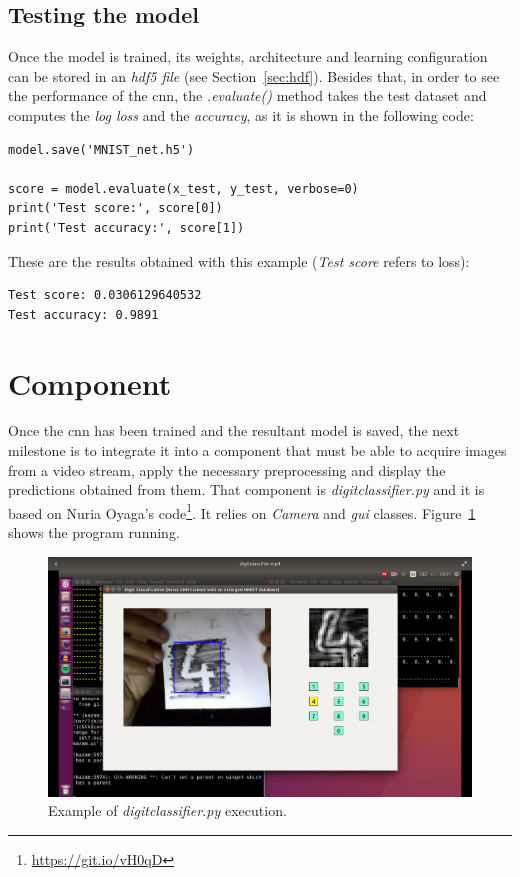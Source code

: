 \subsection{Testing the model}
Once the model is trained, its weights, architecture and learning configuration can be stored in an \emph{\gls{hdf5} file} (see Section~\ref{sec:hdf}). Besides that, in order to see the performance of the \gls{cnn}, the \textit{.evaluate()} method takes the test dataset and computes the \emph{log loss} and the \emph{accuracy}, as it is shown in the following code:
\begin{lstlisting}
model.save('MNIST_net.h5')

score = model.evaluate(x_test, y_test, verbose=0)
print('Test score:', score[0])
print('Test accuracy:', score[1])
\end{lstlisting}
These are the results obtained with this example (\textit{Test score} refers to loss):
\begin{Verbatim}[frame=single]
Test score: 0.0306129640532
Test accuracy: 0.9891
\end{Verbatim}

\section{Component}\label{sec:component}
Once the \gls{cnn} has been trained and the resultant model is saved, the next milestone is to integrate it into a component that must be able to acquire images from a video stream, apply the necessary preprocessing and display the predictions obtained from them. That component is \emph{\textit{digitclassifier.py}} and it is based on Nuria Oyaga's code\footnote{\url{https://git.io/vH0qD}}. It relies on \textit{Camera} and \textit{\gls{gui}} classes. Figure~\ref{fig:digitclass} shows the program running.

\begin{figure}
	\centering
	\includegraphics[width=1\linewidth, keepaspectratio]{figures/digitclass.png}
	\caption{Example of \textit{digitclassifier.py} execution.}
	\label{fig:digitclass}
\end{figure}

